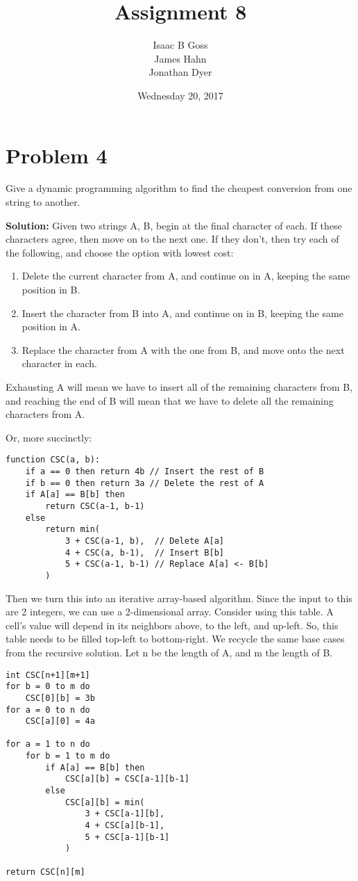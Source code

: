\documentclass{article}
\author{Isaac B Goss\\ James Hahn\\ Jonathan Dyer}
\title{Assignment 8}
\date{Wednesday 20, 2017}
\providecommand{\prob}[1]{\section*{Problem #1}}
\providecommand{\soln}{\textbf{Solution: }}
\providecommand{\tightlist}{
    \setlength{\itemsep}{0pt}\setlength{\parskip}{0pt}
}
\begin{document}
\maketitle

    \prob{4}
    Give a dynamic programming algorithm to find the cheapest conversion from one string to another.
    
    \soln Given two strings A, B, begin at the final character of each.
    If these characters agree, then move on to the next one.
    If they don't, then try each of the following, and choose the option with lowest cost:
    \begin{enumerate}\tightlist
        \item Delete the current character from A, and continue on in A, keeping the same position in B.
        \item Insert the character from B into A, and continue on in B, keeping the same position in A.
        \item Replace the character from A with the one from B, and move onto the next character in each.
    \end{enumerate}

    Exhausting A will mean we have to insert all of the remaining characters from B, and reaching the end of B will mean that we have to delete all the remaining characters from A.
    
    Or, more succinctly:
    
    \begin{lstlisting}
function CSC(a, b):
    if a == 0 then return 4b // Insert the rest of B
    if b == 0 then return 3a // Delete the rest of A
    if A[a] == B[b] then
        return CSC(a-1, b-1)
    else
        return min(
            3 + CSC(a-1, b),  // Delete A[a]
            4 + CSC(a, b-1),  // Insert B[b]
            5 + CSC(a-1, b-1) // Replace A[a] <- B[b]
        )
    \end{lstlisting}

    Then we turn this into an iterative array-based algorithm.
    Since the input to this are 2 integers, we can use a 2-dimensional array.
    Consider using this table.
    A cell's value will depend in its neighbors above, to the left, and up-left.
    So, this table needs to be filled top-left to bottom-right.
    We recycle the same base cases from the recursive solution.
    Let n be the length of A, and m the length of B.
    
    \begin{lstlisting}
int CSC[n+1][m+1]
for b = 0 to m do
    CSC[0][b] = 3b
for a = 0 to n do
    CSC[a][0] = 4a

for a = 1 to n do
    for b = 1 to m do
        if A[a] == B[b] then
            CSC[a][b] = CSC[a-1][b-1]
        else
            CSC[a][b] = min(
                3 + CSC[a-1][b],
                4 + CSC[a][b-1],
                5 + CSC[a-1][b-1]
            )

return CSC[n][m]
    \end{lstlisting}
\end{document}
